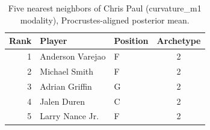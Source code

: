 \begin{table}[htbp]
  \centering\small
  \begin{tabular}{rllc}
    \toprule
    Rank & Player & Position & Archetype \\
    \midrule
    1 & Anderson Varejao & F & 2 \\
    2 & Michael Smith & F & 2 \\
    3 & Adrian Griffin & G & 2 \\
    4 & Jalen Duren & C & 2 \\
    5 & Larry Nance Jr. & F & 2 \\
    \bottomrule
  \end{tabular}
  \caption{Five nearest neighbors of Chris Paul (curvature_m1 modality), Procrustes-aligned posterior mean.}
  \label{tab:Chris_Paul_neighbors_curvature_m1}
\end{table}

